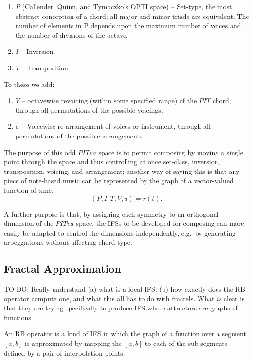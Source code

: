 \documentclass[english,11pt,letterpaper,onecolumn]{scrartcl}
\begin{document}
\begin{enumerate}
 \item $P$ (Callender, Quinn, and Tymoczko's OPTI space) -- Set-type, the most 
abstract conception of a chord; all major and minor triads are equivalent. The 
number of elements in P depends upon the maximum number of voices and the 
number of divisions of the octave.
 \item $I$ -- Inversion.
 \item $T$ -- Transposition.
\end{enumerate}

\noindent To these we add:

\begin{enumerate}[resume]
 \item $V$ -- octavewise revoicing (within some specified range) of the 
$PIT$ chord, through all permutations of the possible voicings.
 \item $a$ -- Voicewise re-arrangement of voices or instrument, through all
permutations of the possible arrangements.
\end{enumerate}

\noindent The purpose of this odd $PITva$ space is to permit composing by 
moving a single point through the space and thus controlling at once 
set-class, inversion, transposition, voicing, and arrangement; another way of 
saying this is that any piece of note-based music can be represented by the 
graph of a vector-valued function of time, $$(P, I, T, V, a) = 
r(t).$$

A further purpose is that, by assigning each symmetry to an orthogonal 
dimension of the $PITva$ space, the IFSs to be developed for composing can 
more easily be adapted to control the dimensions independently, e.g.\ by 
generating arpeggiations without affecting chord type.

\subsection{Fractal Approximation}

TO DO: Really understand (a) what is a local IFS, (b) how exactly does the RB 
operator compute one, and what this all has to do with fractels. What \textit{is\textbf{}} clear 
is that they are trying specifically to produce IFS whose attractors are graphs 
of functions.

An RB operator is a kind of IFS in which the graph of a function over a segment $[a, b]$ is 
approximated by mapping the $[a, b]$ to each of the sub-segments defined by a pair of 
interpolation points.
\end{document}
